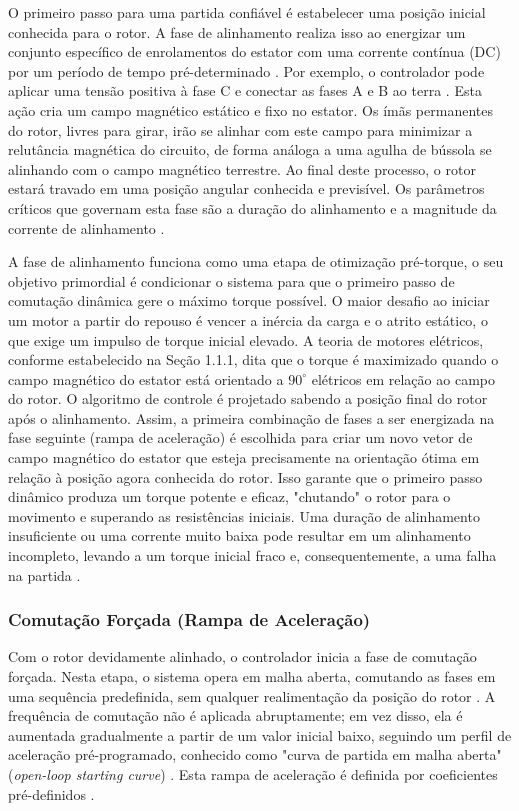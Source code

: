 O primeiro passo para uma partida confiável é estabelecer uma posição inicial conhecida para o rotor. A fase de alinhamento realiza isso ao energizar um conjunto específico de enrolamentos do estator com uma corrente contínua (DC) por um período de tempo pré-determinado \cite{ti2022minimizing, nxp2023sensorless}. Por exemplo, o controlador pode aplicar uma tensão positiva à fase C e conectar as fases A e B ao terra \cite{ti2022minimizing}. Esta ação cria um campo magnético estático e fixo no estator. Os ímãs permanentes do rotor, livres para girar, irão se alinhar com este campo para minimizar a relutância magnética do circuito, de forma análoga a uma agulha de bússola se alinhando com o campo magnético terrestre. Ao final deste processo, o rotor estará travado em uma posição angular conhecida e previsível. Os parâmetros críticos que governam esta fase são a duração do alinhamento e a magnitude da corrente de alinhamento \cite{ti2022minimizing}.

 A fase de alinhamento funciona como uma etapa de otimização pré-torque, o seu objetivo primordial é condicionar o sistema para que o primeiro passo de comutação dinâmica gere o máximo torque possível. O maior desafio ao iniciar um motor a partir do repouso é vencer a inércia da carga e o atrito estático, o que exige um impulso de torque inicial elevado. A teoria de motores elétricos, conforme estabelecido na Seção 1.1.1, dita que o torque é maximizado quando o campo magnético do estator está orientado a $90^{\circ}$ elétricos em relação ao campo do rotor. O algoritmo de controle é projetado sabendo a posição final do rotor após o alinhamento. Assim, a primeira combinação de fases a ser energizada na fase seguinte (rampa de aceleração) é escolhida para criar um novo vetor de campo magnético do estator que esteja precisamente na orientação ótima em relação à posição agora conhecida do rotor. Isso garante que o primeiro passo dinâmico produza um torque potente e eficaz, "chutando" o rotor para o movimento e superando as resistências iniciais. Uma duração de alinhamento insuficiente ou uma corrente muito baixa pode resultar em um alinhamento incompleto, levando a um torque inicial fraco e, consequentemente, a uma falha na partida \cite{ti2022minimizing}.

\subsubsection{Comutação Forçada (Rampa de Aceleração)}

Com o rotor devidamente alinhado, o controlador inicia a fase de comutação forçada. Nesta etapa, o sistema opera em malha aberta, comutando as fases em uma sequência predefinida, sem qualquer realimentação da posição do rotor \cite{nxp2023sensorless}. A frequência de comutação não é aplicada abruptamente; em vez disso, ela é aumentada gradualmente a partir de um valor inicial baixo, seguindo um perfil de aceleração pré-programado, conhecido como "curva de partida em malha aberta" (\textit{open-loop starting curve}) \cite{ti2022minimizing}. Esta rampa de aceleração é definida por coeficientes pré-definidos \cite{ti2022minimizing}.

